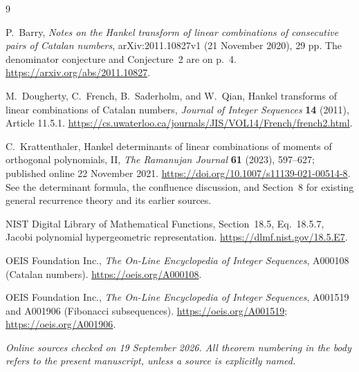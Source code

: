 \documentclass[11pt,a4paper]{article}
\numberwithin{equation}{section}
\theoremstyle{definition}
\theoremstyle{remark}
\begin{document}
\clearpage
\begin{thebibliography}{9}

P.~Barry,
\emph{Notes on the Hankel transform of linear combinations of consecutive
pairs of Catalan numbers}, arXiv:2011.10827v1 (21 November 2020), 29 pp.
The denominator conjecture and Conjecture~2 are on p.~4.
\url{https://arxiv.org/abs/2011.10827}.

M.~Dougherty, C.~French, B.~Saderholm, and W.~Qian,
Hankel transforms of linear combinations of Catalan numbers,
\emph{Journal of Integer Sequences} \textbf{14} (2011), Article 11.5.1.
\url{https://cs.uwaterloo.ca/journals/JIS/VOL14/French/french2.html}.

C.~Krattenthaler,
Hankel determinants of linear combinations of moments of orthogonal
polynomials, II,
\emph{The Ramanujan Journal} \textbf{61} (2023), 597--627;
published online 22 November 2021.
\url{https://doi.org/10.1007/s11139-021-00514-8}.
See the determinant formula, the confluence discussion, and Section~8
for existing general recurrence theory and its earlier sources.

NIST Digital Library of Mathematical Functions,
Section~18.5, Eq.~18.5.7, Jacobi polynomial hypergeometric representation.
\url{https://dlmf.nist.gov/18.5.E7}.

OEIS Foundation Inc., \emph{The On-Line Encyclopedia of Integer Sequences},
A000108 (Catalan numbers).
\url{https://oeis.org/A000108}.

OEIS Foundation Inc., \emph{The On-Line Encyclopedia of Integer Sequences},
A001519 and A001906 (Fibonacci subsequences).
\url{https://oeis.org/A001519}; \url{https://oeis.org/A001906}.

\end{thebibliography}
\noindent\small\textit{Online sources checked on 19 September 2026.
All theorem numbering in the body refers to the present manuscript,
unless a source is explicitly named.}
\end{document}
